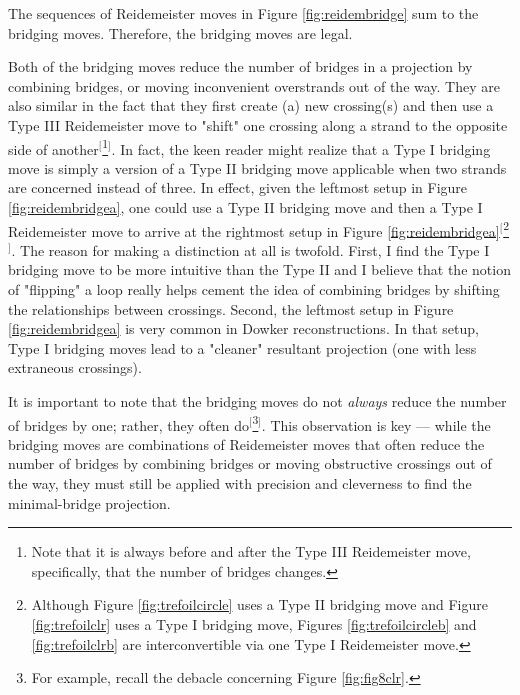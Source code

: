 \documentclass[titlepage,11pt]{article}
\begin{document}
The sequences of Reidemeister moves in Figure \ref{fig:reidembridge} sum to the bridging moves. Therefore, the bridging moves are legal.\par
Both of the bridging moves reduce the number of bridges in a projection by combining bridges, or moving inconvenient overstrands out of the way. They are also similar in the fact that they first create (a) new crossing(s) and then use a Type III Reidemeister move to "shift" one crossing along a strand to the opposite side of another$^[$\footnote{Note that it is always before and after the Type III Reidemeister move, specifically, that the number of bridges changes.}$^]$. In fact, the keen reader might realize that a Type I bridging move is simply a version of a Type II bridging move applicable when two strands are concerned instead of three. In effect, given the leftmost setup in Figure \ref{fig:reidembridgea}, one could use a Type II bridging move and then a Type I Reidemeister move to arrive at the rightmost setup in Figure \ref{fig:reidembridgea}$^[$\footnote{Although Figure \ref{fig:trefoilcircle} uses a Type II bridging move and Figure \ref{fig:trefoilclr} uses a Type I bridging move, Figures \ref{fig:trefoilcircleb} and \ref{fig:trefoilclrb} are interconvertible via one Type I Reidemeister move.}$^]$. The reason for making a distinction at all is twofold. First, I find the Type I bridging move to be more intuitive than the Type II and I believe that the notion of "flipping" a loop really helps cement the idea of combining bridges by shifting the relationships between crossings. Second, the leftmost setup in Figure \ref{fig:reidembridgea} is very common in Dowker reconstructions. In that setup, Type I bridging moves lead to a "cleaner" resultant projection (one with less extraneous crossings).\par
It is important to note that the bridging moves do not \emph{always} reduce the number of bridges by one; rather, they often do$^[$\footnote{For example, recall the debacle concerning Figure \ref{fig:fig8clr}.}$^]$. This observation is key --- while the bridging moves are combinations of Reidemeister moves that often reduce the number of bridges by combining bridges or moving obstructive crossings out of the way, they must still be applied with precision and cleverness to find the minimal-bridge projection.\par
\end{document}
